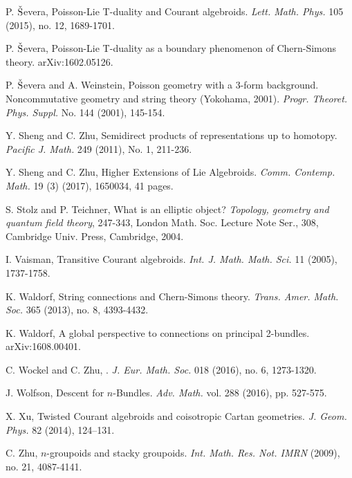 \documentclass[letterpaper,10pt, oneside]{article} %
\begin{document}
\begin{thebibliography}{}
P. ${\rm\check{S}}$evera, Poisson-Lie T-duality and Courant algebroids.   \emph{Lett. Math. Phys.} 105 (2015), no. 12, 1689-1701.

P. ${\rm\check{S}}$evera, Poisson-Lie T-duality as a boundary phenomenon of Chern-Simons theory.  arXiv:1602.05126.

P. ${\rm\check{S}}$evera and A. Weinstein,   Poisson geometry with a $3$-form background. Noncommutative geometry and string theory (Yokohama, 2001). \emph{Progr. Theoret. Phys. Suppl.} No. 144 (2001), 145-154.



Y. Sheng and C. Zhu, Semidirect products of representations up to homotopy. \emph{Pacific J. Math.} 249 (2011), No. 1, 211-236.

Y. Sheng and C. Zhu, Higher Extensions of Lie Algebroids.  \emph{Comm. Contemp. Math.}  19 (3) (2017), 1650034, 41 pages.



S. Stolz and P. Teichner,   What is an elliptic object? \emph{Topology, geometry and quantum field theory}, 247-343, London Math. Soc. Lecture Note Ser., 308, Cambridge Univ. Press, Cambridge, 2004.

 I. Vaisman, Transitive Courant algebroids. \emph{Int. J. Math.
Math. Sci.} 11 (2005), 1737-1758.



K. Waldorf,   String connections and Chern-Simons theory. \emph{Trans. Amer. Math. Soc.} 365 (2013), no. 8, 4393-4432.

K. Waldorf, A global perspective to connections on principal 2-bundles.  arXiv:1608.00401.

C. Wockel and C. Zhu,
.
 \emph{J. Eur. Math. Soc.}   018 (2016), no. 6,  1273-1320.

J. Wolfson, Descent for $n$-Bundles. \emph{Adv. Math.} vol. 288 (2016), pp. 527-575.

X. Xu, Twisted Courant algebroids and coisotropic Cartan geometries. \emph{J. Geom. Phys.} 82 (2014), 124–131.

 C. Zhu,   $n$-groupoids and stacky groupoids. \emph{ Int. Math. Res. Not. IMRN} (2009), no. 21, 4087-4141.

\end{thebibliography}{}
\end{document}
